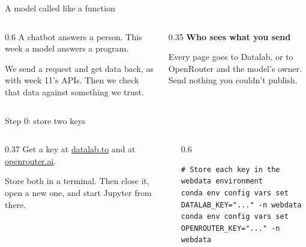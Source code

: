 \documentclass[9pt,aspectratio=169]{beamer}
\begin{document}
\begin{frame}{A model called like a function}
    \begin{columns}[T]
        \begin{column}{0.6\textwidth}
            A chatbot answers a person. This week a model answers a program.

            \medskip
            We send a request and get data back, as with week 11's APIs. Then we check that data against something we trust.
        \end{column}
        \begin{column}{0.35\textwidth}
            \textbf{Who sees what you send}\\[2pt]
            {\footnotesize Every page goes to Datalab, or to OpenRouter and the model's owner. Send nothing you couldn't publish.\par}
        \end{column}
    \end{columns}
\end{frame}

\begin{frame}[fragile]{Step 0: store two keys}
    \begin{columns}[T]
        \begin{column}{0.37\textwidth}
            Get a key at \href{https://www.datalab.to/app/keys}{datalab.to} and at \href{https://openrouter.ai/settings/keys}{openrouter.ai}.

            \medskip
            Store both in a terminal. Then close it, open a new one, and start Jupyter from there.
        \end{column}
        \begin{column}{0.6\textwidth}
\begin{lstlisting}
# Store each key in the webdata environment
conda env config vars set DATALAB_KEY="..." -n webdata
conda env config vars set OPENROUTER_KEY="..." -n webdata
\end{lstlisting}
        \end{column}
    \end{columns}
\end{frame}
\end{document}
